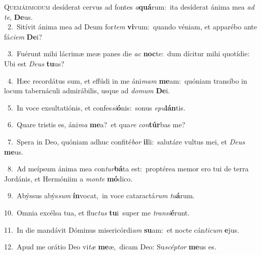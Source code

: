\lettrine{\initial\textcolor{\initialcolor}{Q}}{uemádmodum} desíderat cervus ad fontes \textit{a}\-\textbf{quá}rum:~\star ita desíderat ánima mea \textit{ad} \textit{te}\-, \textbf{De}\-us.\\
{\numbfont\textcolor{\numbcolor}{~2.}}~Sitívit ánima mea ad Deum for\textit{tem} \textbf{vi}\-vum:~\star quando véniam, et apparébo ante fá\-\textit{ci}\-\textit{em} \textbf{De}\-i?\par
{\numbfont\textcolor{\numbcolor}{~3.}}~Fuérunt mihi lácrimæ meæ panes die \textit{ac} \textbf{noc}\-te:~\star dum dícitur mihi quotídie: Ubi est \textit{De}\-\textit{us} \textbf{tu}\-us?\par
{\numbfont\textcolor{\numbcolor}{~4.}}~Hæc recordátus sum, et effúdi in me áni\textit{mam} \textbf{me}\-am:~\star quóniam transíbo in locum tabernáculi admirábilis, usque ad \textit{do}\-\textit{mum} \textbf{De}\-i.\par
{\numbfont\textcolor{\numbcolor}{~5.}}~In voce exsultatiónis, et confes\-\textit{si}\-\textbf{ó}nis:~\star sonus \textit{e}\-\textit{pu}\textbf{lán}tis.\par
{\numbfont\textcolor{\numbcolor}{~6.}}~Quare tristis es, áni\textit{ma} \textbf{me}\-a?~\star et qua\textit{re} \textit{con}\-\textbf{túr}bas me?\par
{\numbfont\textcolor{\numbcolor}{~7.}}~Spera in Deo, quóniam adhuc confité\textit{bor} \textbf{il}\-li:~\star salutáre vultus mei, et \textit{De}\-\textit{us} \textbf{me}\-us.\par
{\numbfont\textcolor{\numbcolor}{~8.}}~Ad meípsum ánima mea con\-\textit{tur}\-\textbf{bá}ta est:~\star proptérea memor ero tui de terra Jordánis, et Hermóniim a \textit{mon}\-\textit{te} \textbf{mó}\-dico.\par
{\numbfont\textcolor{\numbcolor}{~9.}}~Abýssus abýs\textit{sum} \textbf{ín}\-vocat,~\star in voce cataractá\textit{rum} \textit{tu}\-\textbf{á}rum.\par
{\numbfont\textcolor{\numbcolor}{10.}}~Omnia excélsa tua, et fluc\textit{tus} \textbf{tu}\-i~\star super me \textit{trans}\-\textit{i}\textbf{é}runt.\par
{\numbfont\textcolor{\numbcolor}{11.}}~In die mandávit Dóminus misericórdi\textit{am} \textbf{su}\-am:~\star et nocte cán\-\textit{ti}\-\textit{cum} \textbf{e}\-jus.\par
{\numbfont\textcolor{\numbcolor}{12.}}~Apud me orátio Deo vi\textit{tæ} \textbf{me}\-æ,~\star dicam Deo: Su\-\textit{scép}\-\textit{tor} \textbf{me}\-us es.\par
